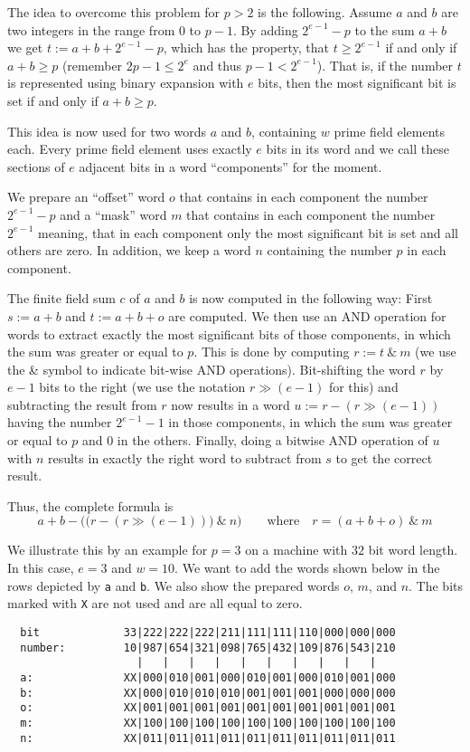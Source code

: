 The idea to overcome this problem for $p > 2$ is the following. 
Assume $a$ and $b$
are two integers in the range from $0$ to $p-1$. By adding
$2^{e-1}-p$ to the sum $a+b$ we get $t := a+b+2^{e-1}-p$, which
has the property, that $t \ge 2^{e-1}$ if and only if $a+b \ge p$
(remember $2p-1 \le 2^e$ and thus $p-1 < 2^{e-1}$). That is, if
the number $t$ is represented using binary expansion with $e$ bits,
then the most significant bit is set if and only if $a+b \ge p$.

This idea is now used for two words $a$ and $b$, containing $w$
prime field elements each. Every prime field element uses exactly $e$ bits
in its word and we call these sections of $e$ adjacent bits in a word 
``components'' for the moment. 

We prepare an ``offset'' word $o$ that contains in each component the
number $2^{e-1}-p$ and a ``mask'' word $m$ that contains in each component
the number $2^{e-1}$ meaning, that in each component only the most significant
bit is set and all others are zero. In addition, we keep a word $n$
containing the number $p$ in each component.

The finite field sum $c$ of $a$ and $b$ is now computed in the following way:
First $s := a+b$ and $t := a+b+o$ are computed. We then use an AND 
operation for words to extract exactly the most significant bits of
those components, in which the sum was greater or equal to $p$.
This is done by computing $r := t \ \&\  m$ (we use the \& symbol to
indicate bit-wise AND operations). Bit-shifting
the word $r$ by $e-1$ bits to the right (we use the notation
$r \gg (e-1)$ for this) and subtracting the
result from $r$ now results in a word $u := r - (r \gg (e-1))$
having the number $2^{e-1}-1$
in those components, in which the sum was greater or equal to $p$ and
$0$ in the others. Finally, doing a bitwise AND operation of $u$ with
$n$ results in exactly the right word to subtract from $s$ to get
the correct result.

Thus, the complete formula is
\[ a+b - \Big(\big(r - (r \gg (e-1))\big) \ \&\ n \Big)
   \qquad \mbox{where}\quad r = (a+b+o) \ \&\  m \]

We illustrate this by an example for $p=3$ on a machine with
$32$ bit word length. In this case, $e = 3$ and $w = 10$. We want to
add the words shown below in the rows depicted by \texttt{a} and \texttt{b}.
We also show the prepared words $o$, $m$, and $n$. The bits marked
with \texttt{X} are not used and are all equal to zero.

\begin{verbatim}
  bit             33|222|222|222|211|111|111|110|000|000|000
  number:         10|987|654|321|098|765|432|109|876|543|210
                    |   |   |   |   |   |   |   |   |   |
  a:              XX|000|010|001|000|010|001|000|010|001|000
  b:              XX|000|010|010|010|001|001|001|000|000|000
  o:              XX|001|001|001|001|001|001|001|001|001|001
  m:              XX|100|100|100|100|100|100|100|100|100|100
  n:              XX|011|011|011|011|011|011|011|011|011|011
\end{verbatim}

